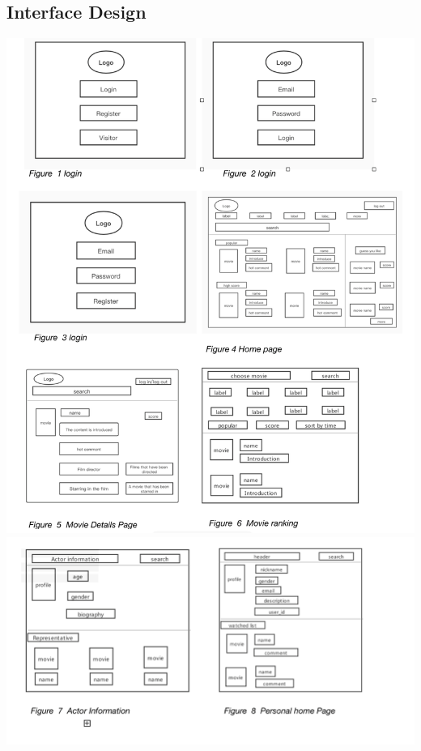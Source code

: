 \documentclass[12pt]{article}
\begin{document}
\subsection{Interface Design}
\includegraphics[width=1.1\linewidth]{inter.png}\\\newpage
\includegraphics[width=1.1\linewidth]{int2.png}\\
\end{document}
